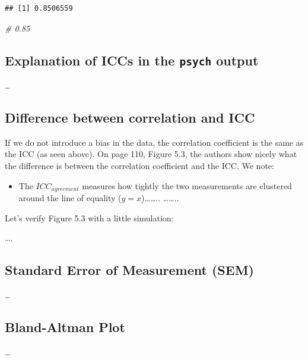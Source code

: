 \documentclass[
]{book}
\newenvironment{Shaded}{\begin{snugshade}}{\end{snugshade}}
\newcommand{\CommentTok}[1]{\textcolor[rgb]{0.56,0.35,0.01}{\textit{#1}}}
\providecommand{\tightlist}{%
  \setlength{\itemsep}{0pt}\setlength{\parskip}{0pt}}
\begin{document}
\begin{verbatim}
## [1] 0.8506559
\end{verbatim}

\begin{Shaded}
\begin{Highlighting}[]
\CommentTok{\# 0.85}
\end{Highlighting}
\end{Shaded}

\subsection{\texorpdfstring{Explanation of ICCs in the \texttt{psych} output}{Explanation of ICCs in the psych output}}\label{explanation-of-iccs-in-the-psych-output}

\ldots{}

\subsection{Difference between correlation and ICC}\label{difference-between-correlation-and-icc}

If we do not introduce a bias in the data, the correlation coefficient
is the same as the ICC (as seen above). On page 110, Figure 5.3, the authors show nicely
what the difference is between the correlation coefficient and the ICC. We note:

\begin{itemize}
\tightlist
\item
  The \(ICC_{agreement}\) measures how tightly the two measurements are
  clustered around the line of equality (\(y=x\))\ldots\ldots..
  \ldots\ldots..
\end{itemize}

Let's verify Figure 5.3 with a little simulation:

\ldots.

\subsection{Standard Error of Measurement (SEM)}\label{standard-error-of-measurement-sem}

\ldots{}

\subsection{Bland-Altman Plot}\label{bland-altman-plot}

\ldots{}
\end{document}
